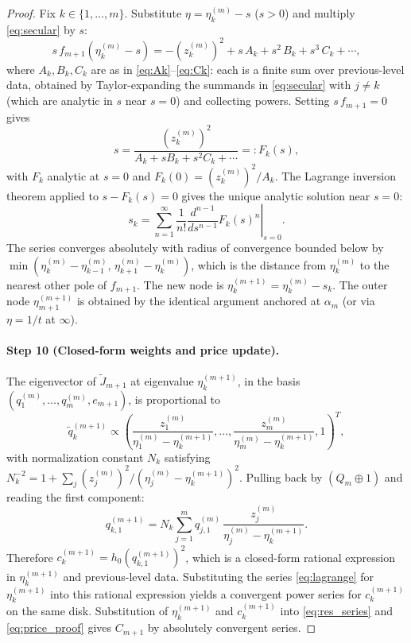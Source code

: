 \documentclass{article}
\begin{document}
\begin{proof}
Fix $k\in\{1,\dots,m\}$.  Substitute $\eta = \eta_k^{(m)} - s$
($s > 0$) and multiply \eqref{eq:secular} by $s$:
\begin{equation}\label{eq:sfm1}
  s\,f_{m+1}(\eta_k^{(m)}-s)
  = -(z_k^{(m)})^2 + s\,A_k + s^2\,B_k + s^3\,C_k + \cdots,
\end{equation}
where $A_k,B_k,C_k$ are as in \eqref{eq:Ak}--\eqref{eq:Ck}:
each is a finite sum over previous-level data, obtained by
Taylor-expanding the summands in \eqref{eq:secular} with $j\ne k$
(which are analytic in $s$ near $s=0$) and collecting powers.
Setting $s\,f_{m+1} = 0$ gives
\begin{equation}\label{eq:fp}
  s = \frac{(z_k^{(m)})^2}{A_k + sB_k + s^2C_k + \cdots}
    =: F_k(s),
\end{equation}
with $F_k$ analytic at $s=0$ and $F_k(0) = (z_k^{(m)})^2/A_k$.
The Lagrange inversion theorem applied to $s - F_k(s) = 0$ gives
the unique analytic solution near $s=0$:
\begin{equation}\label{eq:lagrange}
  s_k = \sum_{n=1}^{\infty}\frac{1}{n!}
    \left.\frac{d^{n-1}}{ds^{n-1}}F_k(s)^n\right|_{s=0}.
\end{equation}
The series converges absolutely with radius of convergence bounded
below by $\min(\eta_k^{(m)} - \eta_{k-1}^{(m)},\,
\eta_{k+1}^{(m)} - \eta_k^{(m)})$, which is the distance from
$\eta_k^{(m)}$ to the nearest other pole of $f_{m+1}$.
The new node is $\eta_k^{(m+1)} = \eta_k^{(m)} - s_k$.
The outer node $\eta_{m+1}^{(m+1)}$ is obtained by the identical
argument anchored at $\alpha_m$ (or via $\eta = 1/t$ at $\infty$).

\paragraph{Step 10 (Closed-form weights and price update).}
The eigenvector of $\widetilde{J}_{m+1}$ at eigenvalue
$\eta_k^{(m+1)}$, in the basis $(q_1^{(m)},\dots,q_m^{(m)},e_{m+1})$,
is proportional to
\begin{equation}\label{eq:evec}
  \widetilde{q}_k^{(m+1)} \propto \left(
    \frac{z_1^{(m)}}{\eta_1^{(m)}-\eta_k^{(m+1)}},\dots,
    \frac{z_m^{(m)}}{\eta_m^{(m)}-\eta_k^{(m+1)}},1
  \right)^T,
\end{equation}
with normalization constant $N_k$ satisfying
$N_k^{-2} = 1 + \sum_j (z_j^{(m)})^2/(\eta_j^{(m)}-\eta_k^{(m+1)})^2$.
Pulling back by $(Q_m\oplus 1)$ and reading the first component:
\begin{equation}\label{eq:qk1}
  q_{k,1}^{(m+1)} = N_k\sum_{j=1}^m q_{j,1}^{(m)}\,
    \frac{z_j^{(m)}}{\eta_j^{(m)} - \eta_k^{(m+1)}}.
\end{equation}
Therefore $c_k^{(m+1)} = h_0(q_{k,1}^{(m+1)})^2$, which is a
closed-form rational expression in $\eta_k^{(m+1)}$ and
previous-level data.  Substituting the series \eqref{eq:lagrange}
for $\eta_k^{(m+1)}$ into this rational expression yields a
convergent power series for $c_k^{(m+1)}$ on the same disk.
Substitution of $\eta_k^{(m+1)}$ and $c_k^{(m+1)}$ into
\eqref{eq:res_series} and \eqref{eq:price_proof} gives
$C_{m+1}$ by absolutely convergent series.


\end{proof}
\end{document}
